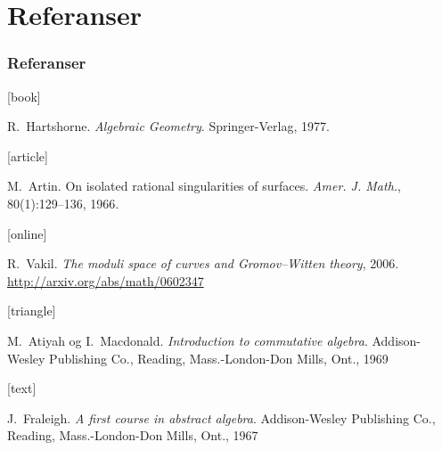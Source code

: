 \documentclass[norsk]{beamer}
\begin{document}
\section{Referanser}


\begin{frame}[allowframebreaks]
    \frametitle{Referanser}

    \begin{thebibliography}{}

        [book]

        R.~Hartshorne.
        \newblock \emph{Algebraic Geometry}.
        \newblock Springer-Verlag, 1977.

        [article]

        M.~Artin.
        \newblock On isolated rational singularities of surfaces.
        \newblock \emph{Amer. J. Math.}, 80(1):129--136, 1966.

       [online]

       R.~Vakil.
       \newblock \emph{The moduli space of curves and Gromov--Witten theory}, 2006.
       \newblock \url{http://arxiv.org/abs/math/0602347}

       [triangle]

       M.~Atiyah og I.~Macdonald.
       \newblock \emph{Introduction to commutative algebra}.
       \newblock Addison-Wesley Publishing Co., Reading, Mass.-London-Don
       Mills, Ont., 1969

       [text]

       J.~Fraleigh.
       \newblock \emph{A first course in abstract algebra}.
       \newblock Addison-Wesley Publishing Co., Reading, Mass.-London-Don Mills, Ont., 1967

       \end{thebibliography}
\end{frame}
\end{document}
